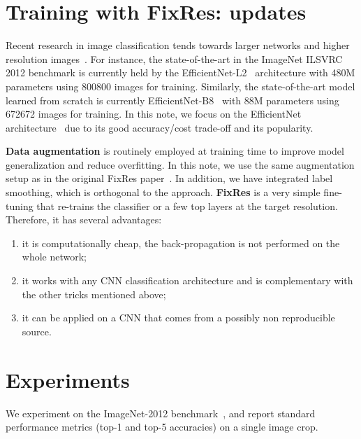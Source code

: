 \documentclass{article}
\begin{document}
 \section{Training with FixRes: updates}\label{sec:related}
\label{sec:trainingupdates}
Recent research in image classification tends towards 
larger networks and higher resolution images~\cite{Yanping2018GPipe,mahajan2018exploring,Xie2019SelftrainingWN}.
For instance, the state-of-the-art in the ImageNet ILSVRC 2012 benchmark is currently held by the EfficientNet-L2~\cite{Xie2019SelftrainingWN} architecture with 480M parameters using 800800 images for training.
Similarly, the state-of-the-art model learned  from  scratch  is  currently EfficientNet-B8~\cite{Xie2019AdversarialEI} with 88M parameters using 672672 images  for training.
In this note, we focus on the EfficientNet architecture~\cite{tan2019efficientnet} due to its good accuracy/cost trade-off and its popularity.

\bigskip
\noindent \textbf{Data augmentation} is routinely employed at training time to improve model generalization and reduce overfitting. 
In this note, we use the same augmentation setup as in the original FixRes paper~\cite{Touvron2019FixRes}.
In addition, we have integrated label smoothing, which is orthogonal to the approach.
{\bf FixRes}
is a very simple fine-tuning that re-trains the classifier or a few top layers at the target resolution. 
Therefore, it has several advantages:
\begin{enumerate}
\item it is computationally cheap, the back-propagation is not performed on the whole network; \\ [-15pt]
\item it works with any CNN classification architecture and is complementary with the other tricks mentioned above;  \\ [-15pt]
\item it can be applied on a CNN that comes from a possibly non reproducible source. 
\end{enumerate}
 \section{Experiments}
\label{sec:experiments}

\newcommand{\bs}{B}

\label{sec:setup}


We experiment on the ImageNet-2012 benchmark~\cite{Russakovsky2015ImageNet12}, and report standard performance metrics (top-1 and top-5 accuracies) on a single image crop. 
\end{document}
